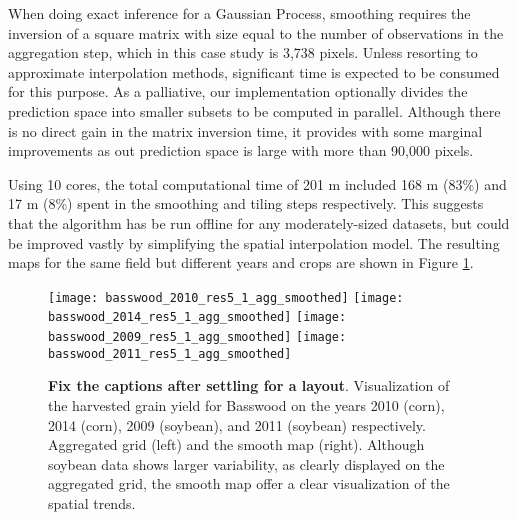 When doing exact inference for a Gaussian Process, smoothing requires
the inversion of a square matrix with size equal to the number of
observations in the aggregation step, which in this case study is
3,738 pixels. Unless resorting to approximate interpolation methods,
significant time is expected to be consumed for this purpose. As a
palliative, our implementation optionally divides the prediction space
into smaller subsets to be computed in parallel. Although there is no
direct gain in the matrix inversion time, it provides with some
marginal improvements as out prediction space is large with more than
90,000 pixels.

Using 10 cores, the total computational time of 201 m included 168 m
(83\%) and 17 m (8\%) spent in the smoothing and tiling steps
respectively. This suggests that the algorithm has be run offline for
any moderately-sized datasets, but could be improved vastly by
simplifying the spatial interpolation model. The resulting maps for
the same field but different years and crops are shown in Figure
\ref{fig:basswood-history}.

\begin{figure}[h!]  \centering
  \texttt{[image: basswood\_2010\_res5\_1\_agg\_smoothed]}
  \texttt{[image: basswood\_2014\_res5\_1\_agg\_smoothed]}
  \texttt{[image: basswood\_2009\_res5\_1\_agg\_smoothed]}
  \texttt{[image: basswood\_2011\_res5\_1\_agg\_smoothed]}
  \caption{\textbf{Fix the captions after settling for a
      layout}. Visualization of the harvested grain yield for Basswood on
    the years 2010 (corn), 2014 (corn), 2009 (soybean), and 2011 (soybean)
    respectively. Aggregated grid (left) and the smooth map
    (right). Although soybean data shows larger variability, as clearly
    displayed on the aggregated grid, the smooth map offer a clear
    visualization of the spatial trends.}
  \label{fig:basswood-history}
\end{figure}

